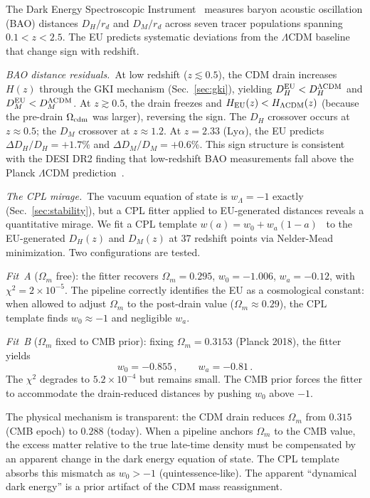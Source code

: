 \documentclass[a4paper,fleqn]{cas-dc}
\begin{document}
The Dark Energy Spectroscopic Instrument~\cite{desi_dr2_2025}
measures baryon acoustic oscillation (BAO) distances $D_H/r_d$
and $D_M/r_d$ across seven tracer populations spanning
$0.1 < z < 2.5$. The EU predicts systematic deviations from
the $\Lambda$CDM baseline that change sign with redshift.

\textit{BAO distance residuals.}~At low redshift ($z \lesssim 0.5$),
the CDM drain increases $H(z)$ through the GKI mechanism
(Sec.~\ref{sec:gki}), yielding $D_H^{\rm EU} < D_H^{\Lambda\rm CDM}$
and $D_M^{\rm EU} < D_M^{\Lambda\rm CDM}$. At $z \gtrsim 0.5$,
the drain freezes and $H_{\rm EU}(z) < H_{\Lambda\rm CDM}(z)$
(because the pre-drain $\Omega_{\rm cdm}$ was larger), reversing
the sign. The $D_H$ crossover occurs at $z \approx 0.5$; the
$D_M$ crossover at $z \approx 1.2$. At $z = 2.33$ (Ly$\alpha$),
the EU predicts $\Delta D_H/D_H = +1.7\%$ and
$\Delta D_M/D_M = +0.6\%$. This sign structure is consistent
with the DESI DR2 finding that low-redshift BAO measurements
fall above the Planck $\Lambda$CDM prediction~\cite{desi_dr2_2025}.

\textit{The CPL mirage.}~The vacuum equation of state is $w_\Lambda = -1$
exactly (Sec.~\ref{sec:stability}), but a CPL fitter
applied to EU-generated distances reveals a
quantitative mirage. We fit a CPL template
$w(a) = w_0 + w_a(1{-}a)$~\cite{chevallier2001, linder2003}
to the EU-generated $D_H(z)$ and $D_M(z)$ at 37 redshift
points via Nelder-Mead minimization. Two configurations
are tested.

\textit{Fit~A} ($\Omega_m$ free):
the fitter recovers $\Omega_m = 0.295$, $w_0 = -1.006$,
$w_a = -0.12$, with $\chi^2 = 2 \times 10^{-5}$. The
pipeline correctly identifies the EU as a cosmological
constant: when allowed to adjust $\Omega_m$ to the
post-drain value ($\Omega_m \approx 0.29$), the CPL
template finds $w_0 \approx -1$ and negligible $w_a$.

\textit{Fit~B} ($\Omega_m$ fixed to CMB prior):
fixing $\Omega_m = 0.3153$ (Planck 2018), the fitter
yields
\begin{equation}
w_0 = -0.855\,,\qquad w_a = -0.81\,.
\label{eq:cpl_mirage}
\end{equation}
The $\chi^2$ degrades to $5.2 \times 10^{-4}$ but remains
small. The CMB prior forces the fitter to accommodate the
drain-reduced distances by pushing $w_0$ above $-1$.

The physical mechanism is transparent: the CDM drain
reduces $\Omega_m$ from $0.315$ (CMB epoch) to $0.288$
(today). When a pipeline anchors $\Omega_m$ to the
CMB value, the excess matter relative to the true
late-time density must be compensated by an apparent
change in the dark energy equation of state. The
CPL template absorbs this mismatch as $w_0 > -1$
(quintessence-like). The apparent ``dynamical dark
energy'' is a prior artifact of the CDM mass
reassignment.
\end{document}
